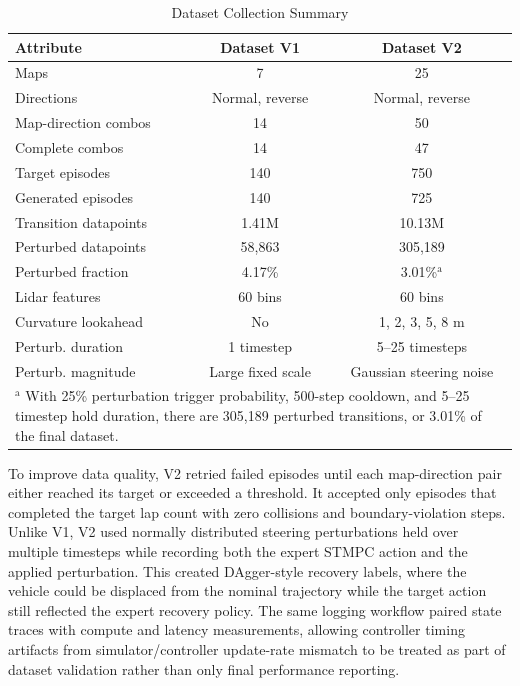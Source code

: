 \documentclass[conference]{IEEEtran}
\begin{document}
\begin{table}[htbp]
\renewcommand{\arraystretch}{1.2}
\caption{Dataset Collection Summary}
\label{tab:dataset_collection}
\centering
    \begin{tabular}{lcc}
        \hline\hline
        \textbf{Attribute} & \textbf{Dataset V1} & \textbf{Dataset V2} \\
        \hline
        Maps & 7 & 25 \\
        Directions & Normal, reverse & Normal, reverse \\
        Map-direction combos & 14 & 50 \\
        Complete combos & 14 & 47 \\
        Target episodes & 140 & 750 \\
        Generated episodes & 140 & 725 \\
        Transition datapoints & 1.41M & 10.13M \\
        Perturbed datapoints & 58,863 & 305,189 \\
        Perturbed fraction & 4.17\% & 3.01\%$^{\mathrm{a}}$ \\
        Lidar features & 60 bins & 60 bins \\
        Curvature lookahead & No & 1, 2, 3, 5, 8 m \\
        Perturb. duration & 1 timestep & 5--25 timesteps \\
        Perturb. magnitude & Large fixed scale & Gaussian steering noise \\
        \hline
        \multicolumn{3}{p{0.92\linewidth}}{\footnotesize
        $^{\mathrm{a}}$ With 25\% perturbation trigger probability, 500-step cooldown, and 5--25 timestep hold duration, there are 305,189 perturbed transitions, or 3.01\% of the final dataset.} \\
        \hline\hline
    \end{tabular}
\end{table}


To improve data quality, V2 retried failed episodes until each map-direction pair either reached its target or exceeded a threshold. It accepted only episodes that completed the target lap count with zero collisions and boundary-violation steps. Unlike V1, V2 used normally distributed steering perturbations held over multiple timesteps while recording both the expert STMPC action and the applied perturbation. This created DAgger-style recovery labels, where the vehicle could be displaced from the nominal trajectory while the target action still reflected the expert recovery policy. The same logging workflow paired state traces with compute and latency measurements, allowing controller timing artifacts from simulator/controller update-rate mismatch to be treated as part of dataset validation rather than only final performance reporting.
\end{document}
